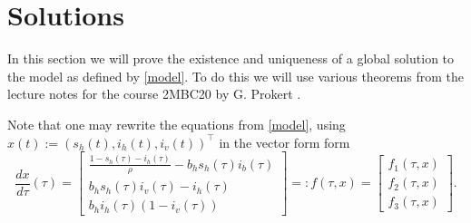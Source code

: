 \section{Solutions} %

In this section we will prove the existence and uniqueness of a global solution to the model
as defined by \ref{model}. To do this we will use various theorems from the lecture notes for the
course 2MBC20 by G. Prokert \cite{lecturenotes}.

Note that one may rewrite the equations from \ref{model}, using $x(t) := (s_h(t), i_h(t), i_v(t))^{\top}$ in the vector form form
\begin{equation} \label{vec-model}
    \frac{dx}{d\tau}(\tau) = \begin{bmatrix}
        \frac{1 - s_h(\tau) - i_h(\tau)}{\rho} - b_h s_h(\tau) i_b(\tau) \\
        b_h s_h(\tau) i_v(\tau) - i_h(\tau) \\
        b_h i_h(\tau)(1 - i_v(\tau))
    \end{bmatrix}
    =: f(\tau,x) = \begin{bmatrix}
        f_1(\tau,x) \\ f_2(\tau, x) \\ f_3(\tau, x)
    \end{bmatrix}.
\end{equation}


